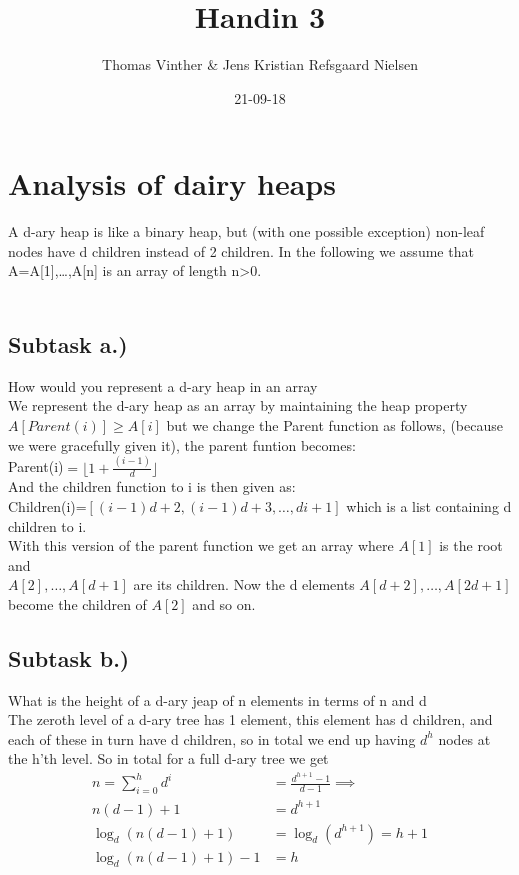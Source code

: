 \documentclass{article}
\theoremstyle{remark}
\numberwithin{equation}{section}
\begin{document}
	\author{Thomas Vinther \& Jens Kristian Refsgaard Nielsen}
	\title{Handin 3}
	\date{21-09-18}
	\maketitle
\section{Analysis of dairy heaps}
A d-ary heap is like a binary heap, but (with one possible exception) non-leaf nodes have d children instead of 2 children. In the following we assume that A=A[1],\dots,A[n] is an array of length n>0.\\\\
\subsection{Subtask a.)} How would you represent a d-ary heap in an array\\
We represent the d-ary heap as an array by maintaining the heap property $A[Parent(i)] \geq A[i]$ but we change the Parent function as follows, (because we were gracefully given it), the parent funtion becomes:
\\Parent(i)$=\lfloor{1+\frac{(i-1)}{d}}\rfloor $\\
And the children function to i is then given as: \\
Children(i)=$[(i-1)d+2,(i-1)d+3,\dots,di+1]$ which is a list containing d children to i.\\
With this version of the parent function we get an array where $A[1]$ is the root and\\ $A[2],\dots,A[d+1]$ are its children. Now the d elements $A[d+2],\dots,A[2d+1]$ become the children of $A[2]$ and so on.\\
\newpage \subsection{Subtask b.)} What is the height of a d-ary jeap of n elements in terms of n and d
\\The zeroth level of a d-ary tree has 1 element, this element has d children, and each of these in turn have d children, so in total we end up having $d^h$ nodes at the h'th level. So in total for a full d-ary tree we get
\begin{align*}
	n = \sum_{i=0}^{h} d^i &= \frac{d^{h+1}-1}{d-1} \implies\\
	n(d-1)+1 &= d^{h+1}\\
	\log_d(n(d-1)+1) &= \log_d(d^{h+1}) = h+1\\
	\log_d(n(d-1)+1)-1 &= h
\end{align*}
\end{document}
